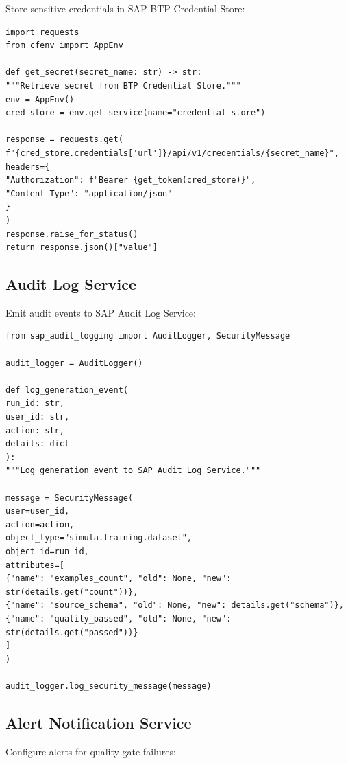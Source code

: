 \documentclass[12pt,a4paper,twoside]{report}
\begin{document}
Store sensitive credentials in SAP BTP Credential Store:

\begin{lstlisting}[language=jsonx,caption={Retrieving secrets from BTP Credential Store}]
import requests
from cfenv import AppEnv

def get_secret(secret_name: str) -> str:
"""Retrieve secret from BTP Credential Store."""
env = AppEnv()
cred_store = env.get_service(name="credential-store")

response = requests.get(
f"{cred_store.credentials['url']}/api/v1/credentials/{secret_name}",
headers={
"Authorization": f"Bearer {get_token(cred_store)}",
"Content-Type": "application/json"
}
)
response.raise_for_status()
return response.json()["value"]
\end{lstlisting}

\subsection{Audit Log Service}

Emit audit events to SAP Audit Log Service:

\begin{lstlisting}[language=jsonx,caption={Audit logging integration}]
from sap_audit_logging import AuditLogger, SecurityMessage

audit_logger = AuditLogger()

def log_generation_event(
run_id: str,
user_id: str,
action: str,
details: dict
):
"""Log generation event to SAP Audit Log Service."""

message = SecurityMessage(
user=user_id,
action=action,
object_type="simula.training.dataset",
object_id=run_id,
attributes=[
{"name": "examples_count", "old": None, "new": str(details.get("count"))},
{"name": "source_schema", "old": None, "new": details.get("schema")},
{"name": "quality_passed", "old": None, "new": str(details.get("passed"))}
]
)

audit_logger.log_security_message(message)
\end{lstlisting}

\subsection{Alert Notification Service}

Configure alerts for quality gate failures:
\end{document}
